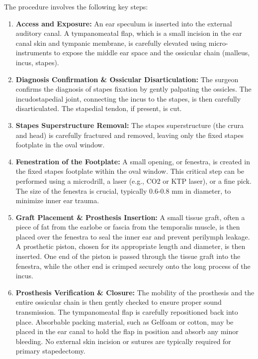 The procedure involves the following key steps:

\begin{enumerate}
  \item \textbf{Access and Exposure:} An ear speculum is inserted into the external auditory canal. A tympanomeatal flap, which is a small incision in the ear canal skin and tympanic membrane, is carefully elevated using micro-instruments to expose the middle ear space and the ossicular chain (malleus, incus, stapes).
  
  \item \textbf{Diagnosis Confirmation \& Ossicular Disarticulation:} The surgeon confirms the diagnosis of stapes fixation by gently palpating the ossicles. The incudostapedial joint, connecting the incus to the stapes, is then carefully disarticulated. The stapedial tendon, if present, is cut.
  
  \item \textbf{Stapes Superstructure Removal:} The stapes superstructure (the crura and head) is carefully fractured and removed, leaving only the fixed stapes footplate in the oval window.
  
  \item \textbf{Fenestration of the Footplate:} A small opening, or fenestra, is created in the fixed stapes footplate within the oval window. This critical step can be performed using a microdrill, a laser (e.g., CO2 or KTP laser), or a fine pick. The size of the fenestra is crucial, typically 0.6-0.8 mm in diameter, to minimize inner ear trauma.
  
  \item \textbf{Graft Placement \& Prosthesis Insertion:} A small tissue graft, often a piece of fat from the earlobe or fascia from the temporalis muscle, is then placed over the fenestra to seal the inner ear and prevent perilymph leakage. A prosthetic piston, chosen for its appropriate length and diameter, is then inserted. One end of the piston is passed through the tissue graft into the fenestra, while the other end is crimped securely onto the long process of the incus.
  
  \item \textbf{Prosthesis Verification \& Closure:} The mobility of the prosthesis and the entire ossicular chain is then gently checked to ensure proper sound transmission. The tympanomeatal flap is carefully repositioned back into place. Absorbable packing material, such as Gelfoam or cotton, may be placed in the ear canal to hold the flap in position and absorb any minor bleeding. No external skin incision or sutures are typically required for primary stapedectomy.
\end{enumerate}

